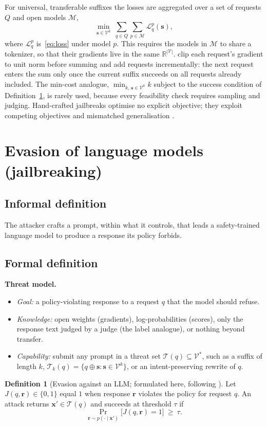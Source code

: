 \documentclass[10pt,a4paper]{extarticle}
\theoremstyle{definition}
\newtheorem{definition}{Definition}[section]
\newcommand{\xadv}{\mathbf{x}'}
\newcommand{\T}{\mathcal{T}}
\newcommand{\threatmodel}[3]{%
\par\noindent\textbf{Threat model.}
\begin{itemize}[leftmargin=1.5em]
  \item \emph{Goal:} #1
  \item \emph{Knowledge:} #2
  \item \emph{Capability:} #3
\end{itemize}\par}
\begin{document}
For universal, transferable suffixes the losses are aggregated over a set of requests $Q$ and open models $\mathcal{M}$,
\begin{equation}\label{eq:universal}
\min_{\mathbf{s}\in\mathcal{V}^k}\ \sum_{q\in Q}\sum_{p\in\mathcal{M}}\mathcal{L}^{p}_q(\mathbf{s}),
\end{equation}
where $\mathcal{L}^{p}_q$ is~\eqref{eq:loss} under model $p$. This requires the models in $\mathcal{M}$ to share a tokenizer, so that their gradients live in the same $\mathbb{R}^{|\mathcal{V}|}$. \citet{zou2023universal} clip each request's gradient to unit norm before summing and add requests incrementally: the next request enters the sum only once the current suffix succeeds on all requests already included. The min-cost analogue, $\min_{k,\,\mathbf{s}\in\mathcal{V}^k} k$ subject to the success condition of Definition~\ref{def:jailbreak}, is rarely used, because every feasibility check requires sampling and judging. Hand-crafted jailbreaks optimise no explicit objective; they exploit competing objectives and mismatched generalisation \citep{wei2023jailbroken}.
\section{Evasion of language models (jailbreaking)}\label{sec:jailbreak}

\subsection{Informal definition}

The attacker crafts a prompt, within what it controls, that leads a safety-trained language model to produce a response its policy forbids.

\subsection{Formal definition}

\threatmodel{a policy-violating response to a request $q$ that the model should refuse.}{open weights (gradients), log-probabilities (scores), only the response text judged by a judge (the label analogue), or nothing beyond transfer.}{submit any prompt in a threat set $\T(q)\subseteq\mathcal{V}^*$, such as a suffix of length $k$, $\T_k(q)=\{q\oplus\mathbf{s}:\mathbf{s}\in\mathcal{V}^k\}$, or an intent-preserving rewrite of $q$.}

\begin{definition}[Evasion against an LLM; formulated here, following \citealp{zou2023universal,chao2023jailbreaking}]\label{def:jailbreak}
Let $J(q,\mathbf{r})\in\{0,1\}$ equal $1$ when response $\mathbf{r}$ violates the policy for request $q$. An attack returns $\xadv\in\T(q)$ and succeeds at threshold $\tau$ if
\[
\Pr_{\mathbf{r}\sim p(\cdot\mid\xadv)}\big[J(q,\mathbf{r})=1\big]\ \ge\ \tau .
\]
\end{definition}
\end{document}
